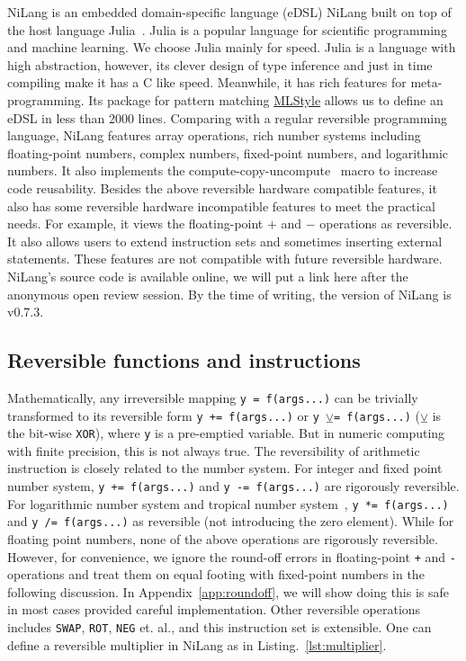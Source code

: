 \documentclass{article}
\newcommand{\<}{\langle}
\renewcommand{\>}{\rangle}
\renewcommand{\cite}[1]{{\citep{#1}}}
\newcommand{\Lst}[1]{Listing.~\ref{#1}}
\newcommand{\App}[1]{Appendix~\ref{#1}}
\theoremstyle{definition}\newtheorem{definition}{\textit{Definition}}
\begin{document}
NiLang is an embedded domain-specific language (eDSL) NiLang built on top of the host language Julia~\cite{Bezanson2012,Bezanson2017}.
Julia is a popular language for scientific programming and machine learning. We choose Julia mainly for speed. Julia is a language with high abstraction, however, its clever design of type inference and just in time compiling make it has a C like speed.
Meanwhile, it has rich features for meta-programming. Its package for pattern matching \href{https://github.com/thautwarm/MLStyle.jl}{MLStyle} allows us to define an eDSL in less than 2000 lines.
Comparing with a regular reversible programming language, NiLang features array operations, rich number systems including floating-point numbers, complex numbers, fixed-point numbers, and logarithmic numbers.
It also implements the compute-copy-uncompute~\cite{Bennett1973} macro to increase code reusability.
Besides the above reversible hardware compatible features, it also has some reversible hardware incompatible features to meet the practical needs. For example, it views the floating-point $\mathrel{+}$ and $\mathrel{-}$ operations as reversible. It also allows users to extend instruction sets and sometimes inserting external statements. These features are not compatible with future reversible hardware.
NiLang's source code is available online, we will put a link here after the anonymous open review session.
By the time of writing, the version of NiLang is v0.7.3.

\subsection{Reversible functions and instructions}
    Mathematically, any irreversible mapping \texttt{y = f(args...)} can be trivially transformed to its reversible form \texttt{y += f(args...)} or \texttt{y $\veebar$= f(args...)} ($\veebar$ is the bit-wise \texttt{XOR}), where \texttt{y} is a pre-emptied variable. But in numeric computing with finite precision, this is not always true. The reversibility of arithmetic instruction is closely related to the number system.
    For integer and fixed point number system, \texttt{y += f(args...)} and \texttt{y -= f(args...)} are rigorously reversible. For logarithmic number system and tropical number system~\cite{Speyer2009}, \texttt{y *= f(args...)} and \texttt{y /= f(args...)} as reversible (not introducing the zero element). While for floating point numbers, none of the above operations are rigorously reversible.
    However, for convenience, we ignore the round-off errors in floating-point \texttt{+} and \texttt{-} operations and treat them on equal footing with fixed-point numbers in the following discussion. In \App{app:roundoff}, we will show doing this is safe in most cases provided careful implementation.
Other reversible operations includes \texttt{SWAP}, \texttt{ROT}, \texttt{NEG} et. al., and this instruction set is extensible.
One can define a reversible multiplier in NiLang as in \Lst{lst:multiplier}.
\end{document}
